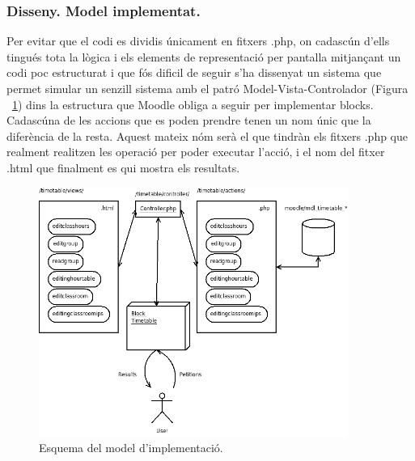 \documentclass[a4paper]{report}  %
\begin{document}
\subsubsection{Disseny. Model implementat.}
Per evitar que el codi es dividis únicament en fitxers .php, on cadascún d'ells tingués tota la lògica i els elements de representació per pantalla 	mitjançant un codi poc estructurat i que fós dificil de seguir s'ha dissenyat un sistema que permet simular un senzill sistema amb el patró Model-Vista-Controlador (Figura ~\ref{fig:DiagramaMyMVC}) dins la estructura que Moodle obliga a seguir per implementar blocks. \\
Cadascúna de les accions que es poden prendre tenen un nom únic que la diferència de la resta. Aquest mateix nóm serà el que tindràn els fitxers .php que realment realitzen les operació per poder executar l'acció, i el nom del fitxer .html que finalment es qui mostra els resultats.\\
		\begin{figure}[H] %
		\begin{center}
		\includegraphics[width=0.90\textwidth,keepaspectratio]{img/DiagramaMyMVC.png}
		\caption[List caption]{Esquema del model d'implementació.}
		\label{fig:DiagramaMyMVC}
		\end{center}
		\end{figure}
\end{document}
